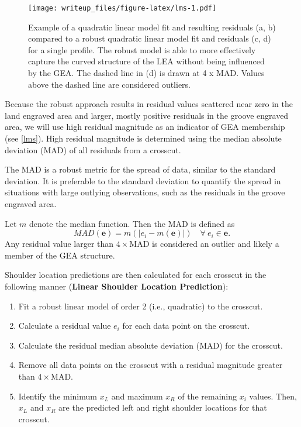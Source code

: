 \documentclass[12pt]{article}
\begin{document}
\begin{figure}
\centering
\texttt{[image: writeup\_files/figure-latex/lms-1.pdf]}
\caption{\label{lms}Example of a quadratic linear model fit and
resulting residuals (a, b) compared to a robust quadratic linear model
fit and residuals (c, d) for a single profile. The robust model is able
to more effectively capture the curved structure of the LEA without
being influenced by the GEA. The dashed line in (d) is drawn at 4 x MAD.
Values above the dashed line are considered outliers.}
\end{figure}

Because the robust approach results in residual values scattered near
zero in the land engraved area and larger, mostly positive residuals in
the groove engraved area, we will use high residual magnitude as an
indicator of GEA membership (see \autoref{lms}). High residual magnitude
is determined using the median absolute deviation (MAD) of all residuals
from a crosscut.

The MAD is a robust metric for the spread of data, similar to the
standard deviation. It is preferable to the standard deviation to
quantify the spread in situations with large outlying observations, such
as the residuals in the groove engraved area.

Let \(m\) denote the median function. Then the MAD is defined as
\[ MAD(\mathbf{e}) = m(|e_i- m(\mathbf{e})|) \quad \forall\ e_i \in \mathbf{e}.\]
Any residual value larger than \(4 \times\)MAD is considered an outlier
and likely a member of the GEA structure.

Shoulder location predictions are then calculated for each crosscut in
the following manner (\textbf{Linear Shoulder Location Prediction}):\\

\begin{enumerate}
\item Fit a robust linear model of order 2 (i.e., quadratic) to the crosscut.   
\item Calculate a residual value $e_i$ for each data point on the crosscut.  
\item Calculate the residual median absolute deviation (MAD) for the crosscut.  
\item Remove all data points on the crosscut with a residual magnitude greater than $4 \times$MAD.  
\item Identify the minimum $x_{L}$ and maximum $x_{R}$ of the remaining $x_i$ values. Then, $x_L$ and $x_R$ are the predicted left and right shoulder locations for that crosscut.   
\end{enumerate}
\end{document}
